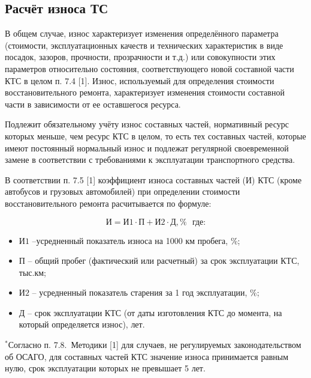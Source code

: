 \subsection{Расчёт износа ТС }

В общем случае, износ характеризует изменения определённого параметра (стоимости, эксплуатационных качеств и технических характеристик в виде посадок, зазоров, прочности, прозрачности и т.д.) или совокупности этих параметров относительно состояния, соответствующего новой составной части КТС в целом п. 7.4 [1]. Износ, используемый для определения стоимости восстановительного ремонта, характеризует изменения стоимости составной части в зависимости от ее оставшегося ресурса.

Подлежит обязательному учёту износ составных частей, нормативный ресурс которых меньше, чем ресурс КТС в целом, то есть тех составных частей, которые имеют постоянный нормальный износ и подлежат регулярной своевременной замене в соответствии с требованиями к эксплуатации транспортного средства.



В соответствии п. 7.5 [1] коэффициент износа составных частей (И) КТС (кроме автобусов и грузовых автомобилей) при определении стоимости восстановительного ремонта расчитывается по формуле:

\begin{equation}\label{eqsnos}
\text{И} =\text{И1}\cdot\text{П}+\text{И2}\cdot \text{Д}, \%  \,\,\,\, \text{где:}
\end{equation}

\begin{itemize}
	\item [] $ \text{И1} $ --усредненный показатель износа на 1000 км пробега, \%; 
	\item [] $ \text{П} $ -- общий пробег (фактический или расчетный) за срок эксплуатации КТС, тыс.км;
	\item [] $ \text{И2} $ -- усредненный показатель старения за 1 год эксплуатации, \%;
	\item [] $ \text{Д} $ -- срок эксплуатации КТС (от даты изготовления КТС до момента, на который определяется износ), лет. 
\end{itemize}

\par $ ^*$Согласно п. 7.8.\, Методики [1]  для случаев, не регулируемых законодательством об ОСАГО, для составных частей КТС значение износа принимается равным нулю, срок эксплуатации которых не превышает 5 лет.

